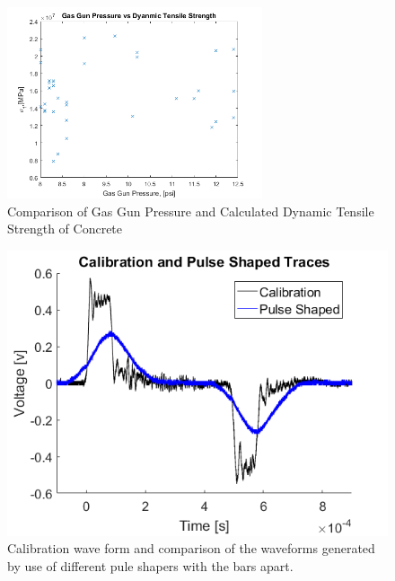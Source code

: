 \documentclass[12pt]{article}
\begin{document}
\begin{figure}[H]
	\centering
	\includegraphics[width=0.67\textwidth]{Pressure_TensileStrength.png}
	\caption{Comparison of Gas Gun Pressure and Calculated Dynamic Tensile Strength of Concrete}
	\label{fig:GasGun}
\end{figure}

\begin{figure}[H]
	\centering
	\includegraphics[width=.75\textwidth]{pulseshaper.png}
	\caption{Calibration wave form and  comparison of the waveforms generated by use of different pule shapers with the bars apart.}
	\label{fig:pulseshaper}
\end{figure}
\end{document}
